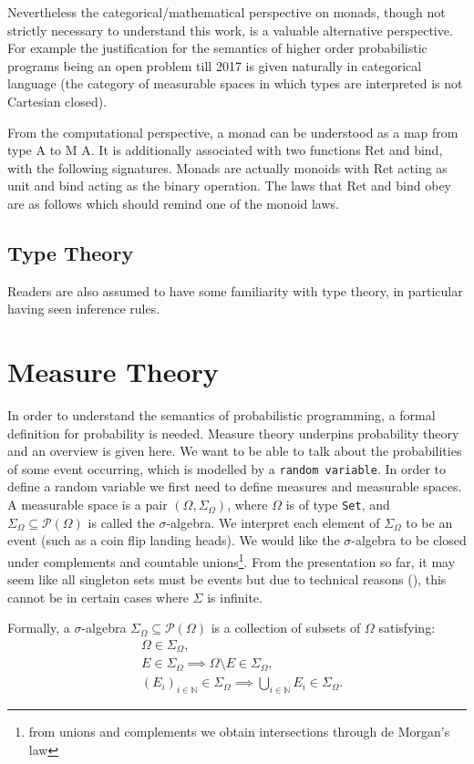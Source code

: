 Nevertheless the categorical/mathematical perspective on monads, though not strictly necessary to understand this work, is a valuable alternative
 perspective. For example the justification for the semantics of higher order probabilistic programs being an open problem till 2017 is given
 naturally in categorical language (the category of measurable spaces in which types are interpreted is not Cartesian closed).

From the computational perspective,
a monad can be understood as a map from type A to M A. It is additionally associated with two functions Ret and bind, with the following
 signatures. Monads are actually monoids with Ret acting as unit and bind acting as the binary operation. The laws that Ret and bind obey are 
 as follows which should remind one of the monoid laws.

\subsection{Type Theory}
Readers are also assumed to have some familiarity with type theory, in particular having seen inference rules.

\section{Measure Theory}
\label{sec:measure-theory}
In order to understand the semantics of probabilistic programming, a formal definition for probability is needed.
Measure theory underpins probability theory and an overview is given here. We want to be able to talk about the
probabilities of some event occurring, which is modelled by a \texttt{random variable}. In order to define a random
variable we first need to define measures and measurable spaces. A measurable space is a pair $(\Omega, \Sigma_\Omega)$,
where $\Omega$ is of type \texttt{Set}, and $\Sigma_\Omega \subseteq \mathcal{P}(\Omega)$ is called the $\sigma$-algebra. We interpret each element of $\Sigma_\Omega$
to be an event (such as a coin flip landing heads). We would like the $\sigma$-algebra to be closed under complements and
countable unions\footnote{from unions and complements we obtain intersections through de Morgan's law}. From the presentation so far, it may seem like all singleton sets must be events but
due to technical reasons (\citep[Chapter 2]{axler}), this cannot be in certain cases where $\Sigma$ is infinite.

Formally, a $\sigma$-algebra $\Sigma_\Omega \subseteq \mathcal{P}(\Omega)$ is a collection of subsets of $\Omega$ satisfying:
\begin{align*}
  &\Omega \in \Sigma_\Omega, \\
  &E \in \Sigma_\Omega \implies \Omega \setminus E \in \Sigma_\Omega, \\
  &(E_i)_{i \in \mathbb{N}} \in \Sigma_\Omega \implies \bigcup_{i \in \mathbb{N}} E_i \in \Sigma_\Omega.
\end{align*}

